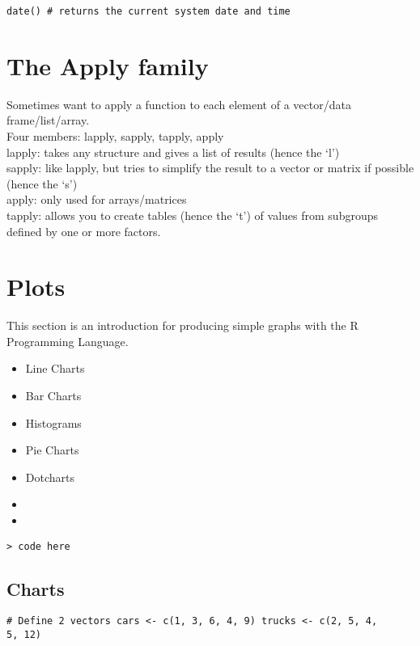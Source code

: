 \documentclass[a4paper,12pt]{article}
\begin{document}
\begin{itemize}
\begin{framed}
\begin{verbatim}
date() # returns the current system date and time
\end{verbatim}
\end{framed}


\section{The Apply family}

Sometimes want to apply a function to each element of a
vector/data frame/list/array.
\\
Four members: lapply, sapply, tapply, apply
\\
lapply: takes any structure and gives a list of results (hence
the `l')
\\
sapply: like lapply, but tries to simplify the result to a
vector or matrix if possible (hence the `s')
\\
apply: only used for arrays/matrices
\\
tapply: allows you to create tables (hence the `t') of values
from subgroups defined by one or more factors.
\newpage

\section{Plots}
This section is an introduction for producing simple graphs with
the R Programming Language.
\begin{itemize}
\item Line Charts  \item Bar Charts \item Histograms \item Pie
Charts \item Dotcharts
\end{itemize}


\begin{itemize}
\item
\item
\end{itemize}
\footnotesize \begin{verbatim}
> code here
 \end{verbatim}\normalsize


\subsection{ Charts}

\begin{myindentpar}{1cm}
\begin{verbatim}
# Define 2 vectors cars <- c(1, 3, 6, 4, 9) trucks <- c(2, 5, 4,
5, 12)


\end{verbatim}
\end{myindentpar}
\end{itemize}
\end{document}
